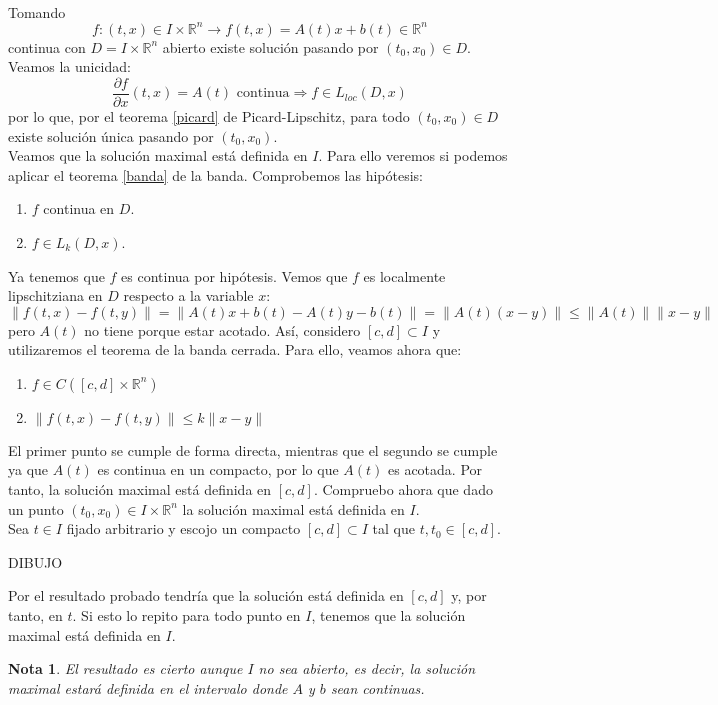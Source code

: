 \documentclass{article}
\makeatletter
\providecommand{\norm}[1]{\lVert#1\rVert}
\theoremstyle{theorem-style}  %
\theoremstyle{definition-style}
\newtheorem*{note}{Nota} %
\theoremstyle{example-style}
\renewenvironment{proof}[1][\proofname]{\par
	\pushQED{\qed}%
	\normalfont \topsep6\p@\@plus6\p@\relax
	\list{}{%
		\settowidth{\leftmargin}{\quad:\hskip\labelsep}%
		\setlength{\labelwidth}{0pt}%
		\setlength{\itemindent}{-\leftmargin}%
	}%
	\item[\hskip\labelsep\itshape#1\@addpunct{:}]\ignorespaces
}{%
	\popQED\endlist\@endpefalse
}
\makeatother
\begin{document}
\begin{proof}\ \\
	Tomando
	\[f:(t, x) \in I \times \mathbb{R}^n \longrightarrow f(t,x)=A(t)x+b(t)\in\mathbb{R}^n\]
	continua con $D = I \times \mathbb{R}^n$ abierto existe solución pasando por $(t_0, x_0) \in D$. Veamos la unicidad:
	\[\frac{\partial f}{\partial x} (t, x) = A(t) \text{ continua} \Rightarrow f \in L_{loc} (D, x)\]
	por lo que, por el teorema \ref{picard} de Picard-Lipschitz, para todo $ (t_0, x_0) \in D$ existe solución única pasando por $(t_0, x_0)$. \\
	Veamos que la solución maximal está definida en $I$. Para ello veremos si podemos aplicar el teorema \ref{banda} de la banda. Comprobemos las hipótesis:
	\begin{enumerate}
		\item $f$ continua en $D$.
		\item $f \in L_k (D, x)$.
	\end{enumerate}
	Ya tenemos que $f$ es continua por hipótesis. Vemos que $f$ es localmente lipschitziana en $D$ respecto a la variable $x$:
	\[\norm{f(t, x) - f(t, y)} = \norm{A(t)x + b(t) - A(t)y - b(t)} = \norm{A(t) (x-y)} \leq \norm{A(t)} \norm{x - y} \]
	pero $A(t)$ no tiene porque estar acotado. Así, considero $[c, d] \subset I$ y utilizaremos el teorema de la banda cerrada. Para ello, veamos ahora que:
	\begin{enumerate}
		\item $f \in C([c, d] \times \mathbb{R}^n)$
		\item $\norm{f(t, x) - f(t, y)} \leq k \norm{x - y}$
	\end{enumerate}
	El primer punto se cumple de forma directa, mientras que el segundo se cumple ya que $A(t)$ es continua en un compacto, por lo que $A(t)$ es acotada. Por tanto, la solución maximal está definida en $[c, d]$. Compruebo ahora que dado un punto $(t_0, x_0) \in I \times \mathbb{R}^n$ la solución maximal está definida en $I$. \\
	Sea $t \in I$ fijado arbitrario y escojo un compacto $[c, d]\subset I$ tal que $t, t_0 \in [c, d]$. \\
	\begin{center}
		DIBUJO
	\end{center}
	Por el resultado probado tendría que la solución está definida en $[c, d]$ y, por tanto, en $t$. Si esto lo repito para todo punto en $I$, tenemos que la solución maximal está definida en $I$.
\end{proof}
\begin{note}
	El resultado es cierto aunque $I$ no sea abierto, es decir, la solución maximal estará definida en el intervalo donde $A$ y $b$ sean continuas.
\end{note}
\end{document}
